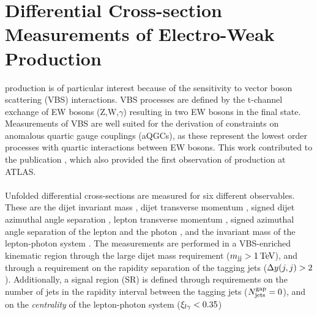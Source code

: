 \documentclass{thesissummary}
\begin{document}
\section{Differential Cross-section Measurements of Electro-Weak \wyjj Production}

\Ewwy production is of particular interest because of the sensitivity to vector boson scattering (VBS) interactions. VBS processes are defined by the t-channel exchange of EW bosons (Z,W,$\gamma$) resulting in two EW bosons in the final state. Measurements of VBS are well suited for the derivation of constraints on anomalous quartic gauge couplings (aQGCs), as these represent the lowest order processes with quartic interactions between EW bosons. This work contributed to the publication \cite{vbswy}, which also provided the first observation of \ewwy production at ATLAS. 
\\\\
%
Unfolded differential cross-sections are measured for six different observables. These are the dijet invariant mass \mjj, dijet transverse momentum \ptjj, signed dijet azimuthal angle separation \jjdphi, lepton transverse momentum \ptlep, signed azimuthal angle separation of the lepton and the photon \lepgamdphi, and the invariant mass of the lepton-photon system \mly. The measurements are performed in a VBS-enriched kinematic region through the large dijet mass requirement ($m_{\text{jj}}>1\hspace{2pt}\text{Te\kern -0.1em V}$), and through a requirement on the rapidity separation of the tagging jets ($\Delta y(j,j)>2$). 
Additionally, a signal region (SR) is defined through requirements on the number of jets in the rapidity interval between the tagging jets ($N^{\text{gap}}_{\text{jets}}=0$), and on the \textit{centrality} of the lepton-photon system ($\xi_{l\gamma}<0.35$)
\end{document}
